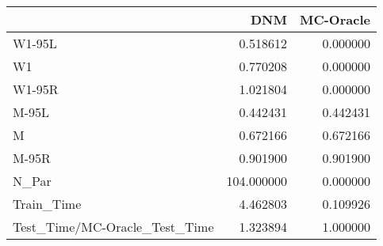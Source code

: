 \begin{tabular}{lrr}
\toprule
{} &         DNM &  MC-Oracle \\
\midrule
W1-95L                        &    0.518612 &   0.000000 \\
W1                            &    0.770208 &   0.000000 \\
W1-95R                        &    1.021804 &   0.000000 \\
M-95L                         &    0.442431 &   0.442431 \\
M                             &    0.672166 &   0.672166 \\
M-95R                         &    0.901900 &   0.901900 \\
N\_Par                         &  104.000000 &   0.000000 \\
Train\_Time                    &    4.462803 &   0.109926 \\
Test\_Time/MC-Oracle\_Test\_Time &    1.323894 &   1.000000 \\
\bottomrule
\end{tabular}
